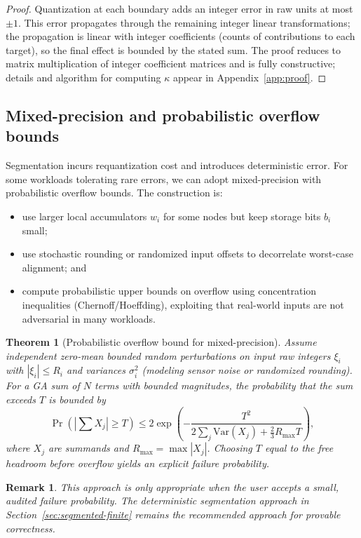 \documentclass[11pt]{article}
\theoremstyle{definition}
\theoremstyle{plain}
\newtheorem{theorem}{Theorem}[section]
\newtheorem{remark}{Remark}[section]
\begin{document}
\begin{proof}
Quantization at each boundary adds an integer error in raw units at most $\pm 1$. This error propagates through the remaining integer linear transformations; the propagation is linear with integer coefficients (counts of contributions to each target), so the final effect is bounded by the stated sum. The proof reduces to matrix multiplication of integer coefficient matrices and is fully constructive; details and algorithm for computing $\kappa$ appear in Appendix~\ref{app:proof}.
\end{proof}

\subsection{Mixed-precision and probabilistic overflow bounds}
Segmentation incurs requantization cost and introduces deterministic error. For some workloads tolerating rare errors, we can adopt mixed-precision with probabilistic overflow bounds.  The construction is:
\begin{itemize}
  \item use larger local accumulators $w_i$ for some nodes but keep storage bits $b_i$ small;
  \item use stochastic rounding or randomized input offsets to decorrelate worst-case alignment; and
  \item compute probabilistic upper bounds on overflow using concentration inequalities (Chernoff/Hoeffding), exploiting that real-world inputs are not adversarial in many workloads.
\end{itemize}

\begin{theorem}[Probabilistic overflow bound for mixed-precision]
\label{thm:prob-bounds}
Assume independent zero-mean bounded random perturbations on input raw integers $\xi_i$ with $|\xi_i|\le R_i$ and variances $\sigma^2_i$ (modeling sensor noise or randomized rounding). For a GA sum of $N$ terms with bounded magnitudes, the probability that the sum exceeds $T$ is bounded by
$$
\Pr\left(\left|\sum X_j\right| \ge T\right) \le 2\exp\left( -\frac{T^2}{2\sum_j \mathrm{Var}(X_j) + \frac{2}{3} R_{\max} T} \right),
$$
where $X_j$ are summands and $R_{\max}=\max |X_j|$. Choosing $T$ equal to the free headroom before overflow yields an explicit failure probability.
\end{theorem}

\begin{remark}
This approach is only appropriate when the user accepts a small, audited failure probability. The deterministic segmentation approach in Section~\ref{sec:segmented-finite} remains the recommended approach for provable correctness.
\end{remark}
\end{document}
